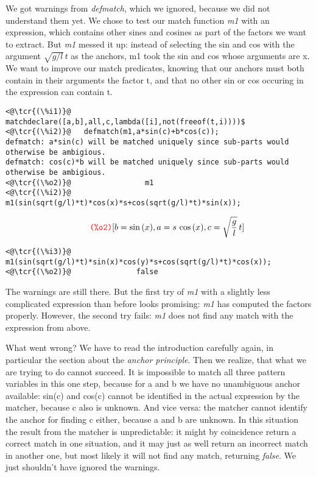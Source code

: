 \documentclass[../Maxima_Workbook.tex]{subfiles}
\begin{document}
\lz We got warnings from \emph{defmatch}, which we ignored, because we did not understand them yet. We chose to test our match function \emph{m1} with an expression, which contains other sines and cosines as part of the factors we want to extract. But \emph{m1} messed it up: instead of selecting the sin and cos with the argument $ \sqrt{g/l} \, t $ as the anchors, m1 took the sin and cos whose arguments are x. We want to improve our match predicates, knowing that our anchors must both contain in their arguments the factor t, and that no other sin or cos occuring in the expression can contain t.

\lz \begin{small}
\color{blue} \leqn
\begin{lstlisting}
<@\tcr{(\%i1)}@   matchdeclare([a,b],all,c,lambda([i],not(freeof(t,i))))$
<@\tcr{(\%i2)}@   defmatch(m1,a*sin(c)+b*cos(c));
defmatch: a*sin(c) will be matched uniquely since sub-parts would otherwise be ambigious.
defmatch: cos(c)*b will be matched uniquely since sub-parts would otherwise be ambigious.
<@\tcr{(\%o2)}@			        m1
<@\tcr{(\%i2)}@   m1(sin(sqrt(g/l)*t)*cos(x)*s+cos(sqrt(g/l)*t)*sin(x));
\end{lstlisting}
\vspace{-4mm} \[\tag*{\tcr{\ttfamily (\%o2)}} [b=\sin{(x)},a=s \, \cos{(x)},c=\sqrt{\frac{g}{l}} \, t] \]
\vspace{-5mm} \begin{lstlisting}
<@\tcr{(\%i3)}@   m1(sin(sqrt(g/l)*t)*sin(x)*cos(y)*s+cos(sqrt(g/l)*t)*cos(x));
<@\tcr{(\%o2)}@			      false
\end{lstlisting}
\color{black} \reqn
\end{small}

\lz The warnings are still there. But the first try of \emph{m1} with a slightly less complicated expression than before looks promising: \emph{m1} has computed the factors properly. However, the second try fails: \emph{m1} does not find any match with the expression from above.

\lz What went wrong? We have to read the introduction carefully again, in particular the section about the \emph{anchor principle}. Then we realize, that what we are trying to do cannot succeed. It is impossible to match all three pattern variables in this one step, because for a and b we have no unambiguous anchor available: sin(c) and cos(c) cannot be identified in the actual expression by the matcher, because c also is unknown. And vice versa: the matcher cannot identify the anchor for finding c either, because a and b are unknown. In this situation the result from the matcher is unpredictable: it might by coincidence return a correct match in one situation, and it may just as well return an incorrect match in another one, but most likely it will not find any match, returning \emph{false}. We just shouldn't have ignored the warnings.
\end{document}
